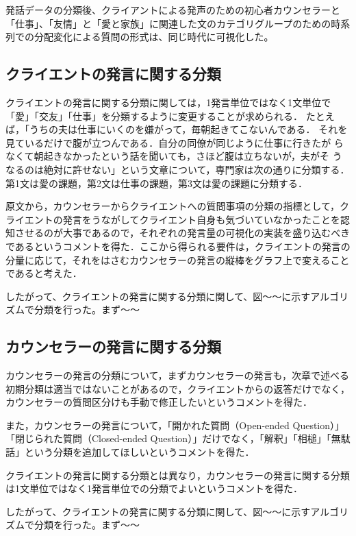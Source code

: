 \documentclass[shuuron]{kuee}
\begin{document}
発話データの分類後、クライアントによる発声のための初心者カウンセラーと「仕事」、「友情」と「愛と家族」に関連した文のカテゴリグループのための時系列での分配変化による質問の形式は、同じ時代に可視化した。

\subsection{クライエントの発言に関する分類}



クライエントの発言に関する分類に関しては，1発言単位ではなく1文単位で「愛」「交友」「仕事」を分類するように変更することが求められる．
たとえば，「うちの夫は仕事にいくのを嫌がって，毎朝起きてこないんである．
それを見ているだけで腹が立つんである．自分の同僚が同じように仕事に行きたが
らなくて朝起きなかったという話を聞いても，さほど腹は立ちないが，夫がそ
うなるのは絶対に許せない」という文章について，専門家は次の通りに分類する．第1文は愛の課題，第2文は仕事の課題，第3文は愛の課題に分類する．

原文から，カウンセラーからクライエントへの質問事項の分類の指標として，クライエントの発言をうながしてクライエント自身も気づいていなかったことを認知させるのが大事であるので，それぞれの発言量の可視化の実装を盛り込むべきであるというコメントを得た．ここから得られる要件は，クライエントの発言の分量に応じて，それをはさむカウンセラーの発言の縦棒をグラフ上で変えることであると考えた．

したがって、クライエントの発言に関する分類に関して、図〜〜に示すアルゴリズムで分類を行った。まず〜〜

\subsection{カウンセラーの発言に関する分類}

カウンセラーの発言の分類について，まずカウンセラーの発言も，次章で述べる初期分類は適当ではないことがあるので，クライエントからの返答だけでなく，カウンセラーの質問区分けも手動で修正したいというコメントを得た．

また，カウンセラーの発言について，「開かれた質問（Open-ended Question）」「閉じられた質問（Closed-ended Question）」だけでなく，「解釈」「相槌」「無駄話」という分類を追加してほしいというコメントを得た．

クライエントの発言に関する分類とは異なり，カウンセラーの発言に関する分類は1文単位ではなく1発言単位での分類でよいというコメントを得た．

したがって、クライエントの発言に関する分類に関して、図〜〜に示すアルゴリズムで分類を行った。まず〜〜
\end{document}
